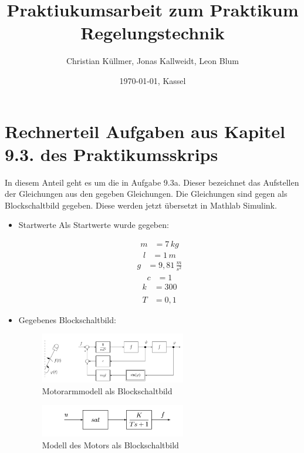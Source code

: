 \documentclass[11pt]{scrartcl}
\begin{document}
\title{Praktiukumsarbeit zum Praktikum Regelungstechnik}
\author{Christian Küllmer, Jonas Kallweidt, Leon Blum}
\date{\today{}, Kassel}
\maketitle
\newpage
\renewcommand{\contentsname}{Inhaltsverzeichnis}
\tableofcontents
\newpage

\section{Rechnerteil Aufgaben aus Kapitel 9.3. des Praktikumsskrips}
In diesem Anteil geht es um die in Aufgabe 9.3a. Dieser bezeichnet das Aufstellen der Gleichungen aus den gegeben Gleichungen. Die Gleichungen sind gegen als Blockschaltbild gegeben. Diese werden jetzt übersetzt in Mathlab Simulink.

\begin{itemize}
\item Startwerte
Als Startwerte wurde gegeben:

\begin{align}
   	m &= 7\, kg
\end{align}
\begin{align}
   	l &= 1\, m
\end{align}
\begin{align}
   	g &= 9,81\, \frac{m}{s^2}
\end{align}
\begin{align}
   	c &= 1
\end{align}
\begin{align}
   	k &= 300  \\\\ T& = 0,1
\end{align}

	
	


\item Gegebenes Blockschaltbild:
\begin{figure}[H]
	\centering
	\includegraphics[width=0.6\textwidth]{Aufgabe9aMotorarm.png}
	\caption{Motorarmmodell als Blockschaltbild}
	\label{img:grafik-dummy}
\end{figure}
\begin{figure}[H]
	\centering
	\includegraphics[width=0.6\textwidth]{Aufgabe9aStreckeMotor.png}
	\caption{Modell des Motors als Blockschaltbild}
	\label{img:grafik-dummy}
\end{figure}
\end{itemize}
\end{document}
